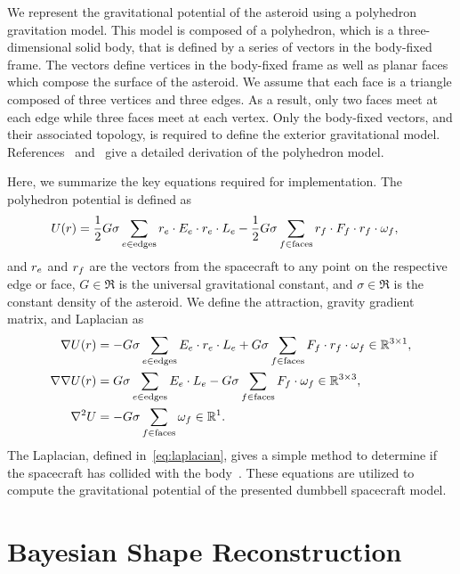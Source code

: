 \documentclass[journal]{new-aiaa}
\begin{document}
We represent the gravitational potential of the asteroid using a polyhedron gravitation model.
This model is composed of a polyhedron, which is a three-dimensional solid body, that is defined by a series of vectors in the body-fixed frame.
The vectors define vertices in the body-fixed frame as well as planar faces which compose the surface of the asteroid.
We assume that each face is a triangle composed of three vertices and three edges.
As a result, only two faces meet at each edge while three faces meet at each vertex.
Only the body-fixed vectors, and their associated topology, is required to define the exterior gravitational model.
References~\cite{werner1994} and~\cite{werner1996} give a detailed derivation of the polyhedron model.

Here, we summarize the key equations required for implementation.
The polyhedron potential is defined as 
\begin{align}
    U(r) &= \frac{1}{2} G \sigma \sum_{e \in \text{edges}} r_e \cdot E_e \cdot r_e \cdot L_e - \frac{1}{2}G \sigma \sum_{f \in \text{faces}} r_f \cdot F_f \cdot r_f \cdot \omega_f,
\end{align}
and \( r_e\) and \(r_f \) are the vectors from the spacecraft to any point on the respective edge or face, \( G\in\Re\) is the universal gravitational constant, and \( \sigma\in\Re \) is the constant density of the asteroid.
We define the attraction, gravity gradient matrix, and Laplacian as
\begin{align}
    \nabla U ( r ) &= -G \sigma \sum_{e \in \text{edges}} E_e \cdot r_e \cdot L_e + G \sigma \sum_{f \in \text{faces}} F_f \cdot r_f \cdot \omega_f \in \mathbb{R}^{3 \times 1} , \label{eq:attraction}\\
    \nabla \nabla U ( r ) &= G \sigma \sum_{e \in \text{edges}} E_e  \cdot L_e - G \sigma \sum_{f \in \text{faces}} F_f \cdot \omega_f \in \mathbb{R}^{3 \times 3}, \label{eq:gradient_matrix}\\
    \nabla^2 U &= -G \sigma \sum_{f \in \text{faces}}  \omega_f \in \mathbb{R}^1 .\label{eq:laplacian}
\end{align}
The Laplacian, defined in~\cref{eq:laplacian}, gives a simple method to determine if the spacecraft has collided with the body~\cite{werner1996}. 
These equations are utilized to compute the gravitational potential of  the presented dumbbell spacecraft model.

\section{Bayesian Shape Reconstruction}\label{sec:radius_update}
\end{document}
